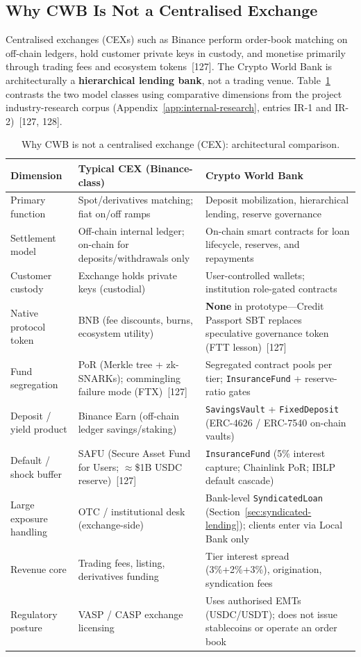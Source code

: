 \documentclass[12pt,a4paper]{report}
\newcommand{\tableheadcolor}{\rowcolor{TableHeadBg}}
\begin{document}
\subsection{Why CWB Is Not a Centralised Exchange}
\label{sec:not-a-cex}

Centralised exchanges (CEXs) such as Binance perform order-book matching on off-chain ledgers, hold customer private keys in custody, and monetise primarily through trading fees and ecosystem tokens~[127]. The Crypto World Bank is architecturally a \textbf{hierarchical lending bank}, not a trading venue. Table~\ref{tab:cex-vs-cwb} contrasts the two model classes using comparative dimensions from the project industry-research corpus (Appendix~\ref{app:internal-research}, entries IR-1 and IR-2)~[127, 128].

\begin{table}[H]
\centering
\caption[Why CWB is not a CEX]{Why CWB is not a centralised exchange (CEX): architectural comparison.}
\label{tab:cex-vs-cwb}
\begin{tabular}{p{3.2cm}p{5.2cm}p{5.2cm}}
\toprule
\tableheadcolor
\textbf{Dimension} & \textbf{Typical CEX (Binance-class)} & \textbf{Crypto World Bank} \\
\midrule
Primary function & Spot/derivatives matching; fiat on/off ramps & Deposit mobilization, hierarchical lending, reserve governance \\
Settlement model & Off-chain internal ledger; on-chain for deposits/withdrawals only & On-chain smart contracts for loan lifecycle, reserves, and repayments \\
Customer custody & Exchange holds private keys (custodial) & User-controlled wallets; institution role-gated contracts \\
Native protocol token & BNB (fee discounts, burns, ecosystem utility) & \textbf{None} in prototype---Credit Passport SBT replaces speculative governance token (FTT lesson)~[127] \\
Fund segregation & PoR (Merkle tree + zk-SNARKs); commingling failure mode (FTX)~[127] & Segregated contract pools per tier; \texttt{InsuranceFund} + reserve-ratio gates \\
Deposit / yield product & Binance Earn (off-chain ledger savings/staking) & \texttt{SavingsVault} + \texttt{FixedDeposit} (ERC-4626 / ERC-7540 on-chain vaults) \\
Default / shock buffer & SAFU (Secure Asset Fund for Users; $\approx$\$1B USDC reserve)~[127] & \texttt{InsuranceFund} (5\% interest capture; Chainlink PoR; IBLP default cascade) \\
Large exposure handling & OTC / institutional desk (exchange-side) & Bank-level \texttt{SyndicatedLoan} (Section~\ref{sec:syndicated-lending}); clients enter via Local Bank only \\
Revenue core & Trading fees, listing, derivatives funding & Tier interest spread (3\%+2\%+3\%), origination, syndication fees \\
Regulatory posture & VASP / CASP exchange licensing & Uses authorised EMTs (USDC/USDT); does not issue stablecoins or operate an order book \\
\bottomrule
\end{tabular}
\end{table}
\end{document}
